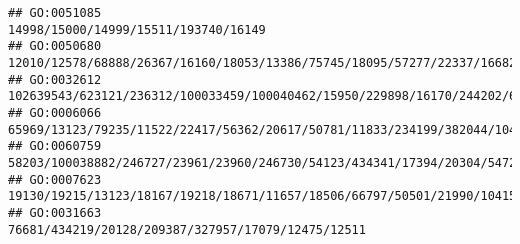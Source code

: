 \documentclass[
]{article}
\begin{document}
\begin{verbatim}
## GO:0051085                                                                                                                                                                                                                                                                                                                                                                         14998/15000/14999/15511/193740/16149
## GO:0050680                                                                                                                                                                                                                                                                                                                          12010/12578/68888/26367/16160/18053/13386/75745/18095/57277/22337/16682/19876/12766
## GO:0032612                                                                                                                                                                                                                                                                                                                     102639543/623121/236312/100033459/100040462/15950/229898/16170/244202/637515/12775/54483
## GO:0006066                                                                                                                                                                                                                                                            65969/13123/79235/11522/22417/56362/20617/50781/11833/234199/382044/104158/13897/102022/234671/234673/11808/66113/103142/18858/105387/58226/13078
## GO:0060759                                                                                                                                                                                                                                                                                                                  58203/100038882/246727/23961/23960/246730/54123/434341/17394/20304/547253/19876/15511/16149
## GO:0007623                                                                                                                                                                                                                                                                                              19130/19215/13123/18167/19218/18671/11657/18506/66797/50501/21990/104158/432530/18126/18053/217369/213311/15566
## GO:0031663                                                                                                                                                                                                                                                                                                                                                           76681/434219/20128/209387/327957/17079/12475/12511

\end{verbatim}
\end{document}
